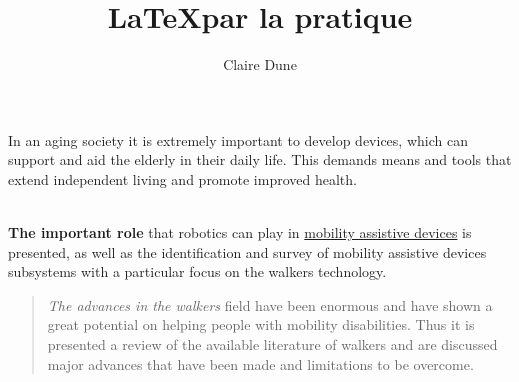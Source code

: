 \documentclass[10pt,a4paper]{article}
\author{Claire Dune}
\title{\LaTeX par la pratique}
\begin{document}
\begin{flushright}
In an aging society it is extremely important to develop devices, which can support and aid the elderly in their daily life. 
This demands means and tools that extend independent living and promote improved health.\\
\end{flushright}


\\


\textbf{The important role} that robotics can play in \underline{mobility assistive devices} is presented, as well as the identification and survey of mobility assistive devices subsystems with a particular focus on the walkers technology. \\


\begin{quote}
\textit{The advances in the walkers} field have been {\LARGE enormous} and have shown a great potential on helping people with mobility disabilities. Thus it is presented a review of the available literature of walkers and are discussed major advances that have been made and limitations to be overcome.
\end{quote}
\end{document}
